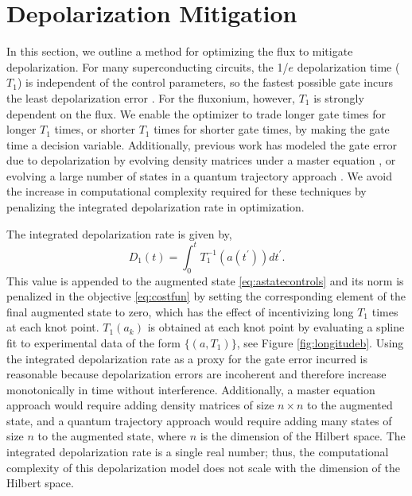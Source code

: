 \section{Depolarization Mitigation\label{sec:longitude}}
In this section, we outline a method
for optimizing the flux to mitigate depolarization.
For many superconducting circuits, the 1/$e$ depolarization time
($T_{1}$) is independent of the control parameters,
so the fastest possible gate incurs the least depolarization error
\cite{schulteherbruggen2011optimal}.
For the fluxonium, however, $T_{1}$ is strongly dependent on the flux.
We enable the optimizer to trade longer gate times
for longer $T_{1}$ times, or shorter $T_{1}$ times for shorter gate times,
by making the gate time a decision variable.
Additionally, previous work has modeled the gate error due to depolarization
by evolving density matrices under a master
equation \cite{rembold2020introduction, schulteherbruggen2011optimal},
or evolving a large number of states in a quantum trajectory approach
\cite{abdelhafez2019gradient}.
We avoid the increase in computational complexity required for these
techniques by penalizing the integrated depolarization rate in optimization.

The integrated depolarization rate is given by,
\begin{equation}
  D_{1}(t) = \int_{0}^{t} T_{1}^{-1}(a(t^{\prime})) dt^{\prime}.
\end{equation}
This value is appended to the augmented state \eqref{eq:astatecontrols}
and its norm is penalized in the objective \eqref{eq:costfun} by setting
the corresponding element of the final augmented state to zero,
which has the effect of incentivizing long $T_{1}$ times at each knot point.
$T_{1}(a_{k})$ is obtained at each knot point by evaluating
a spline fit to experimental data of the form $\{(a, T_{1})\}$,
see Figure \ref{fig:longitudeb}.
Using the integrated depolarization rate as a proxy for the gate error incurred
is reasonable because depolarization errors are incoherent and therefore
increase monotonically in time without interference.
Additionally, a master equation approach would require adding
density matrices of size $n \times n$
to the augmented state, and a quantum trajectory approach
would require adding many states of size $n$ to the augmented state,
where $n$ is the dimension of the Hilbert space.
The integrated depolarization rate is a single
real number; thus, the computational complexity of this
depolarization model does not scale
with the dimension of the Hilbert space.

